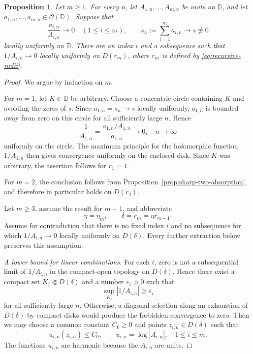 \documentclass[12pt,letterpaper,reqno]{amsart}
\newtheorem{prop}[thm]{Proposition}
\theoremstyle{definition}
\numberwithin{equation}{section}
\newcommand{\D}{\mathbb D}
\newcommand{\OO}{\mathcal O}
\begin{document}
	\begin{prop}\label{thm:absorption}
		Let $m\ge1$. For every $n$, let $A_{1,n},\ldots,A_{m,n}$ be units on
		$\D$, and let $a_{1,n},\ldots,a_{m,n}\in\OO(\D)$. Suppose that
		\begin{equation}\label{eq:absorption-hypotheses}
			\frac{a_{i,n}}{A_{i,n}}\longrightarrow0\quad(1\le i\le m),
			\qquad
			s_n:=\sum_{i=1}^{m}a_{i,n}\longrightarrow s\not\equiv0
		\end{equation}
		locally uniformly on $\D$. There are an index $i$ and a subsequence
		such that $1/A_{i,n}\to0$ locally uniformly on $D(r_m)$, where $r_m$
		is defined by \eqref{eq:recursive-radii}.
	\end{prop}
	\begin{proof}
		We argue by induction on $m$.
		
		For $m=1$, let $K\Subset\D$ be arbitrary. Choose a concentric circle
		containing $K$ and avoiding the zeros of $s$. Since $a_{1,n}=s_n\to s$
		locally uniformly, $a_{1,n}$ is bounded away from zero on this circle
		for all sufficiently large $n$. Hence
		\begin{equation*}
			\frac1{A_{1,n}}=\frac{a_{1,n}/A_{1,n}}{a_{1,n}}\longrightarrow0,\quad
			n\to\infty
		\end{equation*}
		uniformly on the circle. The maximum principle for the holomorphic
		function $1/A_{1,n}$ then gives convergence uniformly on the enclosed
		disk. Since $K$ was arbitrary, the assertion follows for $r_1=1$.
		
		For $m=2$, the conclusion follows from
		Proposition~\ref{prop:sharp-two-absorption}, and therefore in particular
		holds on $D(r_2)$.
		
		Let $m\ge3$, assume the result for $m-1$, and abbreviate
		\begin{equation*}
			\eta=\eta_m,\qquad \delta=r_m=\eta r_{m-1}.
		\end{equation*}
		Assume for contradiction that there is no fixed index $i$ and no
		subsequence for which $1/A_{i,n}\to0$ locally uniformly on
		$D(\delta)$. Every further extraction below preserves this assumption.
		
		\smallskip\noindent\emph{A lower bound for linear combinations.}
		For each $i$, zero is not a subsequential limit of $1/A_{i,n}$ in the
		compact-open topology on $D(\delta)$. Hence there exist a compact set
		$K_i\Subset D(\delta)$ and a number $\varepsilon_i>0$ such that
		\begin{equation*}
			\sup_{K_i}|1/A_{i,n}|\ge\varepsilon_i
		\end{equation*}
		for all sufficiently large $n$. Otherwise, a diagonal selection along
		an exhaustion of $D(\delta)$ by compact disks would produce the
		forbidden convergence to zero. Then we
		may choose a common constant $C_0\ge0$ and points
		$z_{i,n}\in D(\delta)$ such that
		\begin{equation}\label{eq:failure-points}
			u_{i,n}(z_{i,n})\le C_0,
			\qquad u_{i,n}=\log|A_{i,n}|,\quad 1\leq i\leq m.
		\end{equation}
		The functions $u_{i,n}$ are harmonic because the $A_{i,n}$ are units.
		

\end{proof}
\end{document}
